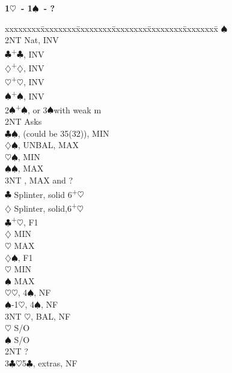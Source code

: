 \documentclass[10pt]{article}
\renewcommand{\c}{$\clubsuit$}
\renewcommand{\d}{$\diamondsuit$}
\newcommand{\h}{$\heartsuit$}
\newcommand{\s}{$\spadesuit$}
\newcommand{\p}{\textsuperscript{+}}
\newenvironment{bidtable}[1][]
{\textbf{#1}
  \begin{adjustwidth}{1em}{}
    \addvspace{2pt}
    \begin{tabbing}
      xxxxxxxx\=xxxxxxxx\=xxxxxxxx\=xxxxxxxx\=xxxxxxxx\=xxxxxxxx\=\kill}
{\end{tabbing}\end{adjustwidth}\bigskip}%
\begin{document}
\begin{multicols*}{2}
\begin{bidtable}[1\h\ - 1\s\ - ?]
    \>      \s {}                          \\
    \> 2NT  \> Nat, INV                             \\
    \c  {}\p\c, INV                           \\
    \d  {}\p\d, INV                           \\
    \h  {}\p\h, INV                           \\
    \s  {}\p\s, INV                           \\
2\s {}\p\s, or 3\s with weak m                    \\
    \> 2NT  \> Asks                                 \\
    \>      \c {}\s, (could be 35(32)), MIN   \\
    \>      \d {}\s, UNBAL, MAX               \\
    \>      \h {}\s, MIN                      \\
    \>      \s {}\s, MAX                      \\
    \>      \> 3NT , MAX and ?               \\
    \>      \c \> Splinter, solid 6\p\h         \\
    \>      \d \> Splinter, solid,6\p\h         \\
    \c  {}\p\h, F1                            \\
    \>      \d \> MIN                      \\
    \>      \h \> MAX                      \\
    \d  {}\s, F1                              \\
    \>      \h \> MIN                      \\
    \>      \s \> MAX                      \\
    \h  {}\h, 4\s, NF                         \\
    \s  {}-1\h, 4\s, NF                       \\
    \> 3NT  \h, BAL, NF                         \\
    \h  \> S/O                                  \\
    \s  \> S/O                                  \\
2NT \> ?                                             \\
3\c {}\h 5\c, extras, NF                          \\

\end{bidtable}
\end{multicols*}
\end{document}
